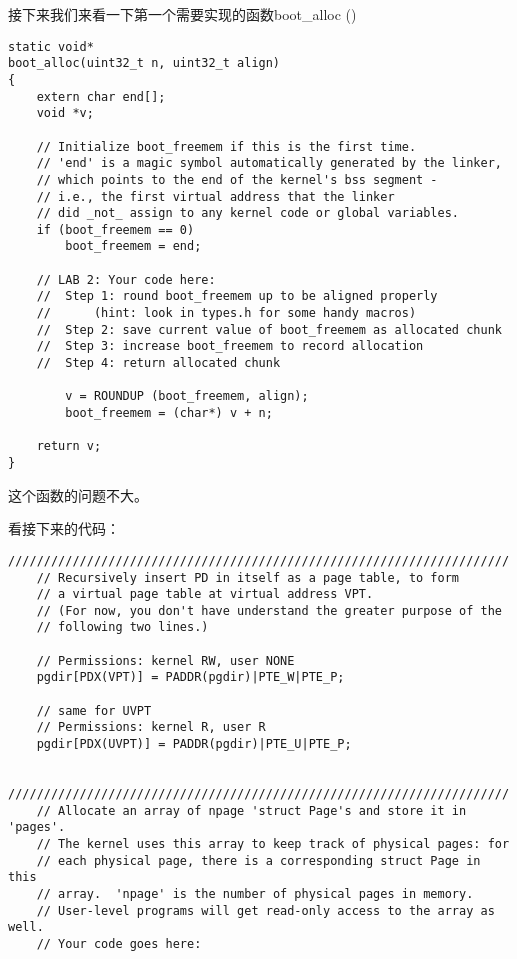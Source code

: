 \documentclass{article}
\newcommand{\funcname}[1]{{\ttfamily \small #1}}
\begin{document}
\begin{CJK*}{UTF8}{gkai}
接下来我们来看一下第一个需要实现的函数\funcname{boot\_alloc ()}

\begin{lstlisting}[style=ccode, title={\scriptsize \ttfamily \bfseries kern/pmap.c: boot\_alloc ()}]
static void*
boot_alloc(uint32_t n, uint32_t align)
{
	extern char end[];
	void *v;

	// Initialize boot_freemem if this is the first time.
	// 'end' is a magic symbol automatically generated by the linker,
	// which points to the end of the kernel's bss segment -
	// i.e., the first virtual address that the linker
	// did _not_ assign to any kernel code or global variables.
	if (boot_freemem == 0)
		boot_freemem = end;

	// LAB 2: Your code here:
	//	Step 1: round boot_freemem up to be aligned properly
	//		(hint: look in types.h for some handy macros)
	//	Step 2: save current value of boot_freemem as allocated chunk
	//	Step 3: increase boot_freemem to record allocation
	//	Step 4: return allocated chunk

    	v = ROUNDUP (boot_freemem, align);
    	boot_freemem = (char*) v + n;
    
	return v;
}
\end{lstlisting}

这个函数的问题不大。

看接下来的代码：

\begin{lstlisting}[style=ccode, title={\scriptsize \ttfamily \bfseries kern/pmap.c: i386\_vm\_init ()}]
	//////////////////////////////////////////////////////////////////////
	// Recursively insert PD in itself as a page table, to form
	// a virtual page table at virtual address VPT.
	// (For now, you don't have understand the greater purpose of the
	// following two lines.)

	// Permissions: kernel RW, user NONE
	pgdir[PDX(VPT)] = PADDR(pgdir)|PTE_W|PTE_P;

	// same for UVPT
	// Permissions: kernel R, user R 
	pgdir[PDX(UVPT)] = PADDR(pgdir)|PTE_U|PTE_P;

	//////////////////////////////////////////////////////////////////////
	// Allocate an array of npage 'struct Page's and store it in 'pages'.
	// The kernel uses this array to keep track of physical pages: for
	// each physical page, there is a corresponding struct Page in this
	// array.  'npage' is the number of physical pages in memory.
	// User-level programs will get read-only access to the array as well.
	// Your code goes here:
	


\end{lstlisting}
\end{CJK*}
\end{document}
